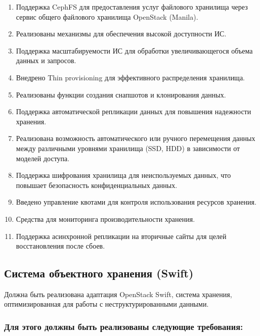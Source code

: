 \documentclass[14pt, a4paper]{extarticle}
\begin{document}
\begin{enumerate}
\item Поддержка CephFS для предоставления услуг файлового хранилища через сервис общего файлового хранилища OpenStack (Manila).
\item Реализованы механизмы для обеспечения высокой доступности ИС.
\item Поддержка масштабируемости ИС для обработки увеличивающегося объема данных и запросов.
\item Внедрено Thin provisioning для эффективного распределения хранилища.
\item Реализованы функции создания снапшотов и клонирования данных.
\item Поддержка автоматической репликации данных для повышения надежности хранения.
\item Реализована возможность автоматического или ручного перемещения данных между различными уровнями хранилища (SSD, HDD) в зависимости от моделей доступа.
\item Поддержка шифрования хранилища для неиспользуемых данных, что повышает безопасность конфиденциальных данных.
\item Введено управление квотами для контроля использования ресурсов хранения.
\item Средства для мониторинга производительности хранения.
\item Поддержка асинхронной репликации на вторичные сайты для целей восстановления после сбоев.
\end{enumerate}

\subsection{Система объектного хранения (Swift)}

Должна быть реализована адаптация OpenStack Swift, система хранения, оптимизированная для работы с неструктурированными данными.

\subsubsection*{Для этого должны быть реализованы следующие требования:}
\end{document}
